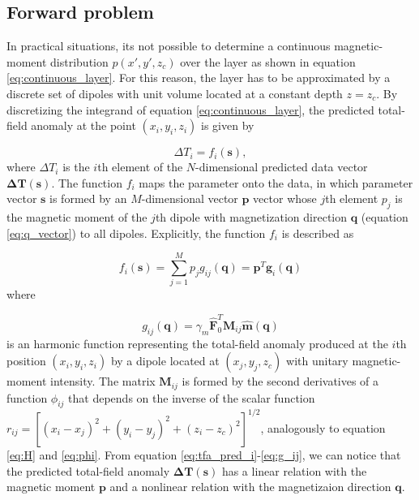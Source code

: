 \subsection{Forward problem}

In practical situations, its not possible to determine a continuous magnetic-moment distribution $p(x',y',z_c)$ over the layer as shown in equation \ref{eq:continuous_layer}. For this reason, the layer has to be approximated by a discrete set of dipoles with unit volume located at a constant depth $z = z_c$. By discretizing the integrand of equation \ref{eq:continuous_layer}, the predicted total-field anomaly at the point $(x_i,y_i,z_i)$ is given by 

\begin{equation}
\Delta T_i = f_i(\mathbf{s}) ,
\label{eq:tfa_pred_i}
\end{equation}    
where $\Delta T_i$ is the $i$th element of the $N$-dimensional predicted data vector $\mathbf{\Delta T}(\mathbf{s})$. The function $f_i$ maps the parameter onto the data, in which parameter vector $\mathbf{s}$ is formed by an $M$-dimensional vector $\mathbf{p}$ vector whose $j$th element $p_j$ is the magnetic moment of the $j$th dipole with magnetization direction $\mathbf{q}$ (equation \ref{eq:q_vector}) to all dipoles. Explicitly, the function $f_i$ is described as 

\begin{equation}
f_i (\mathbf{s}) = \sum_{j=1}^{M} p_j g_{ij} (\mathbf{q}) = \mathbf{p}^T \mathbf{g}_i(\mathbf{q})
\label{eq:f_i}
\end{equation}
where

\begin{equation}
g_{ij} (\mathbf{q})  = \gamma_m \hat{\mathbf{F}}_0^T \mathbf{M}_{ij} \hat{\mathbf{m}}(\mathbf{q})
\label{eq:g_ij}
\end{equation}
is an harmonic function representing the total-field anomaly produced at the $i$th position $(x_i,y_i,z_i)$ by a dipole located at $(x_j,y_j,z_c)$ with unitary magnetic-moment intensity. The matrix $\mathbf{M}_{ij}$ is formed by the second derivatives of a function $\phi_{ij}$ that depends on the inverse of the scalar function $r_{ij} = [(x_i-x_j)^2 + (y_i-y_j)^2 + (z_i-z_c)^2]^{1/2}$, analogously to equation \ref{eq:H} and \ref{eq:phi}. From equation \ref{eq:tfa_pred_i}-\ref{eq:g_ij}, we can notice that the predicted total-field anomaly $\mathbf{\Delta T} (\mathbf{s})$ has a linear relation with the magnetic moment $\mathbf{p}$ and a nonlinear relation with the magnetizaion direction $\mathbf{q}$.    

